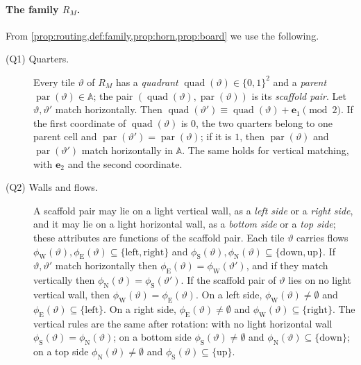 \paragraph{The family $R_M$.} From \cref{prop:routing,def:family,prop:horn,prop:board} we use the following.
\begin{description}
\item[(Q1) Quarters.] Every tile $\vartheta$ of $R_M$ has a \emph{quadrant} $\operatorname{quad}(\vartheta)\in\{0,1\}^2$ and a \emph{parent} $\operatorname{par}(\vartheta)\in\mathbb A$; the pair $(\operatorname{quad}(\vartheta),\operatorname{par}(\vartheta))$ is its \emph{scaffold pair}. Let $\vartheta,\vartheta'$ match horizontally. Then $\operatorname{quad}(\vartheta')\equiv\operatorname{quad}(\vartheta)+\mathbf e_1\pmod 2$. If the first coordinate of $\operatorname{quad}(\vartheta)$ is $0$, the two quarters belong to one parent cell and $\operatorname{par}(\vartheta')=\operatorname{par}(\vartheta)$; if it is $1$, then $\operatorname{par}(\vartheta)$ and $\operatorname{par}(\vartheta')$ match horizontally in $\mathbb A$. The same holds for vertical matching, with $\mathbf e_2$ and the second coordinate.
\item[(Q2) Walls and flows.] A scaffold pair may lie on a light vertical wall, as a \emph{left side} or a \emph{right side}, and it may lie on a light horizontal wall, as a \emph{bottom side} or a \emph{top side}; these attributes are functions of the scaffold pair. Each tile $\vartheta$ carries flows $\phi_{\mathrm W}(\vartheta),\phi_{\mathrm E}(\vartheta)\subseteq\{\mathrm{left},\mathrm{right}\}$ and $\phi_{\mathrm S}(\vartheta),\phi_{\mathrm N}(\vartheta)\subseteq\{\mathrm{down},\mathrm{up}\}$. If $\vartheta,\vartheta'$ match horizontally then $\phi_{\mathrm E}(\vartheta)=\phi_{\mathrm W}(\vartheta')$, and if they match vertically then $\phi_{\mathrm N}(\vartheta)=\phi_{\mathrm S}(\vartheta')$. If the scaffold pair of $\vartheta$ lies on no light vertical wall, then $\phi_{\mathrm W}(\vartheta)=\phi_{\mathrm E}(\vartheta)$. On a left side, $\phi_{\mathrm W}(\vartheta)\ne\emptyset$ and $\phi_{\mathrm E}(\vartheta)\subseteq\{\mathrm{left}\}$. On a right side, $\phi_{\mathrm E}(\vartheta)\ne\emptyset$ and $\phi_{\mathrm W}(\vartheta)\subseteq\{\mathrm{right}\}$. The vertical rules are the same after rotation: with no light horizontal wall $\phi_{\mathrm S}(\vartheta)=\phi_{\mathrm N}(\vartheta)$; on a bottom side $\phi_{\mathrm S}(\vartheta)\ne\emptyset$ and $\phi_{\mathrm N}(\vartheta)\subseteq\{\mathrm{down}\}$; on a top side $\phi_{\mathrm N}(\vartheta)\ne\emptyset$ and $\phi_{\mathrm S}(\vartheta)\subseteq\{\mathrm{up}\}$.

\end{description}
